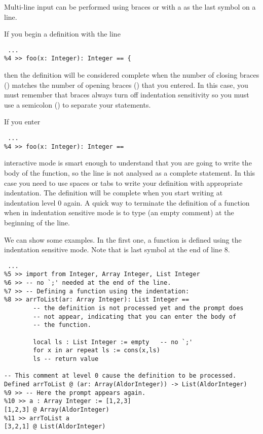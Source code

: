 Multi-line input can be performed using braces or with a \ttin{==} as
the last symbol on a line. 

If you begin a definition with the line
{\small
\begin{verbatim}
 ...
%4 >> foo(x: Integer): Integer == {
\end{verbatim}
}
then the definition will be considered complete when the number of closing
braces (\ttin{\}}) matches the number of opening braces (\ttin{\{}) that
you entered. In this case, you must remember that braces always turn off
indentation sensitivity so you must use a semicolon (\ttin{;}) to
separate your statements.

If you enter
{\small
\begin{verbatim}
 ...
%4 >> foo(x: Integer): Integer ==
\end{verbatim}
}
\asharp{} interactive mode is smart enough to understand that you are
going to write the body of the function, so the line is not analysed
as a complete statement.  In this case you need to use
spaces or tabs to write your definition with appropriate indentation.
The definition will be complete when you start writing at
indentation level 0 again.
A quick way to terminate the definition of a function when
in indentation sensitive mode is to type \ttin{--} (an empty comment) at the
beginning of the line.


We can show some examples. In the first one, a function
 is defined using the indentation sensitive mode. Note that
\ttin{==} is last symbol at the end of line 8.

{\small
\begin{verbatim}
 ...
%5 >> import from Integer, Array Integer, List Integer
%6 >> -- no `;' needed at the end of the line.
%7 >> -- Defining a function using the indentation:
%8 >> arrToList(ar: Array Integer): List Integer ==
        -- the definition is not processed yet and the prompt does
        -- not appear, indicating that you can enter the body of
        -- the function.

        local ls : List Integer := empty   -- no `;'
        for x in ar repeat ls := cons(x,ls)
        ls -- return value

-- This comment at level 0 cause the definition to be processed.
Defined arrToList @ (ar: Array(AldorInteger)) -> List(AldorInteger)
%9 >> -- Here the prompt appears again.
%10 >> a : Array Integer := [1,2,3]
[1,2,3] @ Array(AldorInteger)
%11 >> arrToList a
[3,2,1] @ List(AldorInteger)

\end{verbatim}
}

